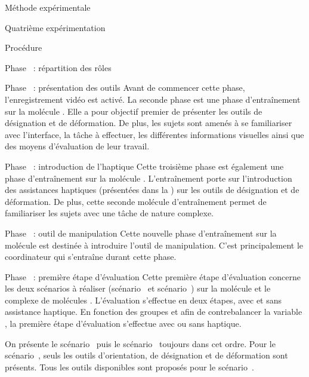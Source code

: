 \documentclass[myfrancais,ngerman,english,french]{mythesis}
\begin{document}
\begin{mychapter}{Méthode expérimentale}
\begin{mysection}{Quatrième expérimentation}
\begin{mysubsection}{Procédure}
\begin{myparagraph}{Phase~ : répartition des rôles}
				\end{myparagraph}
				\begin{myparagraph}{Phase~ : présentation des outils}
					Avant de commencer cette phase, l'enregistrement vidéo est activé.
					La seconde phase est une phase d'entraînement sur la molécule \myTRPCAGE.
					Elle a pour objectif premier de présenter les outils de désignation et de déformation.
					De plus, les sujets sont amenés à se familiariser avec l'interface, la tâche à effectuer, les différentes informations visuelles ainsi que des moyens d'évaluation de leur travail.
				\end{myparagraph}
				\begin{myparagraph}{Phase~ : introduction de l'haptique}
					Cette troisième phase est également une phase d'entraînement sur la molécule \myPrion.
					L'entraînement porte sur l'introduction des assistances haptiques (présentées dans la ) sur les outils de désignation et de déformation.
					De plus, cette seconde molécule d'entraînement permet de familiariser les sujets avec une tâche de nature complexe.
				\end{myparagraph}
				\begin{myparagraph}{Phase~ : outil de manipulation}
					Cette nouvelle phase d'entraînement sur la molécule \myTRPZIPPER est destinée à introduire l'outil de manipulation.
					C'est principalement le coordinateur qui s'entraîne durant cette phase.
				\end{myparagraph}
				\begin{myparagraph}{Phase~ : première étape d'évaluation}
					Cette première étape d'évaluation concerne les deux scénarios à réaliser (scénario~ et scénario~) sur la molécule \myUbiquitin et le complexe de molécules \myNusENusG.
					L'évaluation s'effectue en deux étapes, avec et sans assistance haptique.
					En fonction des groupes et afin de contrebalancer la variable , la première étape d'évaluation s'effectue avec ou sans haptique.

					On présente le scénario~ puis le scénario~ toujours dans cet ordre.
					Pour le scénario~, seuls les outils d'orientation, de désignation et de déformation sont présents.
					Tous les outils disponibles sont proposés pour le scénario~.


\end{myparagraph}
\end{mysubsection}
\end{mysection}
\end{mychapter}
\end{document}
